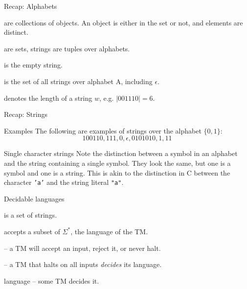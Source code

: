 \documentclass{beamer}
\begin{document}
\begin{frame}{Recap: Alphabets}

  \begin{description}[Alphabets]
    \setlength\itemsep{6mm}
    \item[Sets] are collections of objects. An object is either in the set or not, and elements are distinct.
    \item[Alphabets] are sets, strings are tuples over alphabets.
    \item[$\epsilon$] is the empty string.
    \item[$A^*$] is the set of all strings over alphabet A, including $\epsilon$.
    \item[$|w|$] denotes the length of a string $w$, e.g. $|001110|=6$.
  \end{description}
\end{frame}

\begin{frame}{Recap: Strings}
  \vspace{2mm}
  \begin{alertblock}{Examples}
    \vspace{2mm}
    The following are examples of strings over the alphabet $\{0,1\}$:
    $$100110, 111, 0, \epsilon, 0101010, 1, 11$$
  \end{alertblock}
  \vspace{2mm}
\begin{alertblock}{Single character strings}
  \vspace{2mm}
Note the distinction between a symbol in an alphabet and the string containing a single symbol.
They look the same, but one is a symbol and one is a string. 
This is akin to the distinction in C between the character \texttt{'a'} and the string literal \texttt{"a"}.
\end{alertblock}
\end{frame}


\begin{frame}{Decidable languages}
  \begin{description}
    \setlength\itemsep{6mm}
    \item[Language] is a set of strings.
    \item[TM] accepts a subset of $\Sigma^*$, the language of the TM.
    \item[Halting] -- a TM will accept an input, reject it, or never halt.
    \item[Decider] -- a TM that halts on all inputs \emph{decides} its language.
    \item[Decidable] language -- some TM decides it.
  \end{description}
\end{frame}
\end{document}

